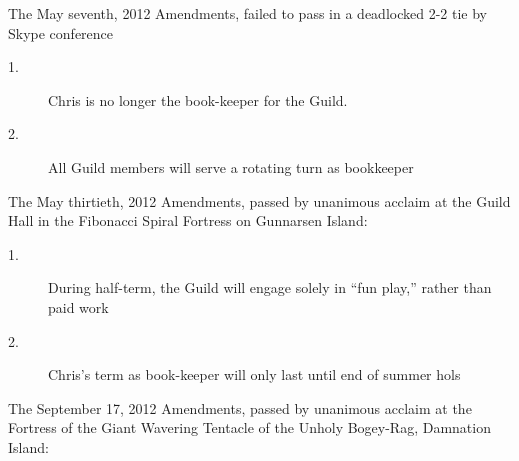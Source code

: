 \tb

The May seventh, 2012 Amendments, failed to pass in a deadlocked 2-2 
tie by Skype conference

\begin{description}
\item[1.] Chris is no longer the book-keeper for the Guild.

\item[2.] All Guild members will serve a rotating turn as bookkeeper
\end{description}

\tb

The May thirtieth, 2012 Amendments, passed by unanimous acclaim at the 
Guild Hall in the Fibonacci Spiral Fortress on Gunnarsen Island:

\begin{description}
\item[1.] During half-term, the Guild will engage solely in “fun play,” 
rather than paid work

\item[2.] Chris's term as book-keeper will only last until end of summer hols
\end{description}

\tb

The September 17, 2012 Amendments, passed by unanimous acclaim at the 
Fortress of the Giant Wavering Tentacle of the Unholy Bogey-Rag, 
Damnation Island:

